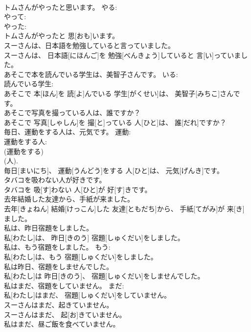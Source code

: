 \documentclass[8pt]{extreport}
\begin{document}
\begin{CJK}{UTF8}{min}
\\	トムさんがやったと思います。	やる: 
\\	やって: 
\\	やった: 
\\	トムさんがやったと 思[おも]います。	
\\	スーさんは、日本語を勉強していると言っていました。	
\\	スーさんは、 日本語[にほんご]を 勉強[べんきょう]していると 言[い]っていました。	
\\	あそこで本を読んでいる学生は、美智子さんです。	いる: 
\\	読んでいる学生: 
\\	あそこで 本[ほん]を 読[よ]んでいる 学生[がくせい]は、 美智子[みちこ]さんです。	
\\	あそこで写真を撮っている人は、誰ですか？	
\\	あそこで 写真[しゃしん]を 撮[と]っている 人[ひと]は、 誰[だれ]ですか？	
\\	毎日、運動をする人は、元気です。	運動: 
\\	運動をする人: 
\\	(運動をする) 
\\	(人). 
\\	毎日[まいにち]、 運動[うんどう]をする 人[ひと]は、 元気[げんき]です。	
\\	タバコを吸わない人が好きです。	
\\	タバコを 吸[す]わない 人[ひと]が 好[す]きです。	
\\	去年結婚した友達から、手紙が来ました。	
\\	去年[きょねん] 結婚[けっこん]した 友達[ともだち]から、 手紙[てがみ]が 来[き]ました。	
\\	私は、昨日宿題をしました。	
\\	私[わたし]は、 昨日[きのう] 宿題[しゅくだい]をしました。	
\\	私は、もう宿題をしました。	もう: 
\\	私[わたし]は、もう 宿題[しゅくだい]をしました。	
\\	私は昨日、宿題をしませんでした。	
\\	私[わたし]は 昨日[きのう]、 宿題[しゅくだい]をしませんでした。	
\\	私はまだ、宿題をしていません。	まだ: 
\\	私[わたし]はまだ、 宿題[しゅくだい]をしていません。	
\\	スーさんはまだ、起きていません。	
\\	スーさんはまだ、 起[お]きていません。	
\\	私はまだ、昼ご飯を食べていません。	

\end{CJK}
\end{document}
